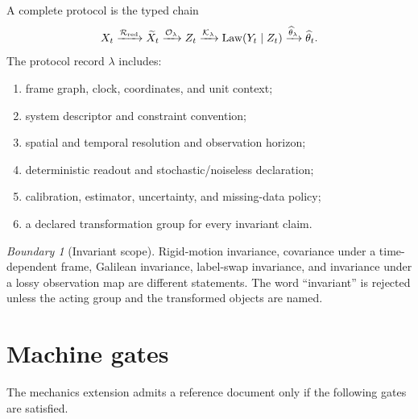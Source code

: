 \documentclass[11pt,a4paper]{article}
\theoremstyle{definition}
\theoremstyle{plain}
\theoremstyle{remark}
\newtheorem{warning}[definition]{Boundary}
\newcommand{\Ocal}{\mathcal O}
\newcommand{\Kcal}{\mathcal K}
\newcommand{\Rcal}{\mathcal R}
\begin{document}
A complete protocol is the typed chain
\[
X_t\xrightarrow{\Rcal_{\rm red}}\widetilde X_t
\xrightarrow{\Ocal_\lambda}Z_t
\xrightarrow{\Kcal_\lambda}\operatorname{Law}(Y_t\mid Z_t)
\xrightarrow{\widehat\theta_\lambda}\widehat\theta_t.
\]
The protocol record \(\lambda\) includes:
\begin{enumerate}[label=(\roman*)]
  \item frame graph, clock, coordinates, and unit context;
  \item system descriptor and constraint convention;
  \item spatial and temporal resolution and observation horizon;
  \item deterministic readout and stochastic/noiseless declaration;
  \item calibration, estimator, uncertainty, and missing-data policy;
  \item a declared transformation group for every invariant claim.
\end{enumerate}

\begin{warning}[Invariant scope]
Rigid-motion invariance, covariance under a time-dependent frame,
Galilean invariance, label-swap invariance, and invariance under a
lossy observation map are different statements. The word
``invariant'' is rejected unless the acting group and the transformed
objects are named.
\end{warning}

\section{Machine gates}

The mechanics extension admits a reference document only if the
following gates are satisfied.
\end{document}
